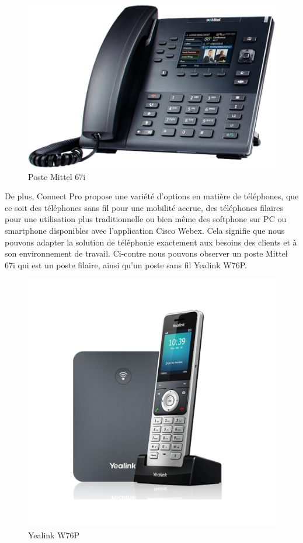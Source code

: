 \documentclass[12pt, a4paper]{article}
\begin{document}
\newpage
\begingroup
\setlength{\intextsep}{0pt}
\begin{figure}
	\includegraphics[scale=.5]{img/mittel.jpg}
	\caption{Poste Mittel 67i}
\end{figure}
De plus, Connect Pro propose une variété
d'options en matière de téléphones, que
ce soit des téléphones sans fil pour
une mobilité accrue, des téléphones
filaires pour une utilisation plus
traditionnelle ou bien même des softphone 
sur PC ou smartphone disponibles avec 
l'application Cisco Webex. Cela signifie que nous pouvons
adapter la solution de téléphonie exactement aux besoins
des clients et à son environnement de travail.
Ci-contre nous pouvons observer un poste Mittel 67i
qui est un poste filaire, ainsi qu'un poste sans fil
Yealink W76P.\\
\begin{figure}
	\includegraphics[scale=.6]{img/yealink.png}
	\caption{Yealink W76P}
\end{figure}
\end{document}
